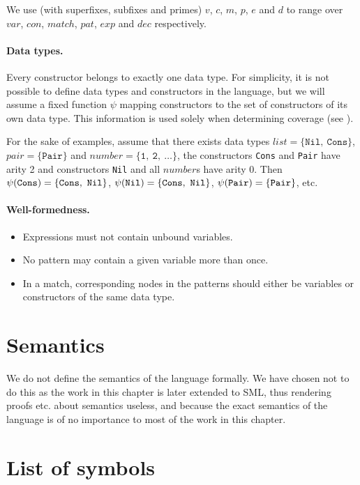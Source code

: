 We use (with superfixes, subfixes and primes) $v$, $c$, $m$, $p$, $e$ and $d$ to
range over $var$, $con$, $match$, $pat$, $exp$ and $dec$ respectively.

\paragraph{Data types.} Every constructor belongs to exactly one data type. For
simplicity, it is not possible to define data types and constructors in the
language, but we will assume a fixed function $\psi$ mapping constructors to the
set of constructors of its own data type. This information is used solely when
determining coverage (see ).

For the sake of examples, assume that there exists data types $list =
\{\texttt{Nil},\ \texttt{Cons}\}$, $pair = \{\texttt{Pair}\}$ and $number =
\{\texttt{1},\ \texttt{2},\ \ldots\}$, the constructors \texttt{Cons} and
\texttt{Pair} have arity 2 and constructors \texttt{Nil} and all $number$s have
arity 0. Then $\psi(\texttt{Cons}) = \{\texttt{Cons},\ \texttt{Nil}\}$, $\psi(\texttt{Nil})
= \{\texttt{Cons},\ \texttt{Nil}\}$, $\psi(\texttt{Pair}) = \{\texttt{Pair}\}$, etc.

\paragraph{Well-formedness.}
\begin{itemize}
\item Expressions must not contain unbound variables.
\item No pattern may contain a given variable more than once.
\item In a match, corresponding nodes in the patterns should either be variables
  or constructors of the same data type.
\end{itemize}

\section{Semantics}
We do not define the semantics of the language formally. We have chosen not to
do this as the work in this chapter is later extended to SML, thus rendering
proofs etc. about semantics useless, and because the exact semantics of the
language is of no importance to most of the work in this chapter.

\section{List of symbols}

